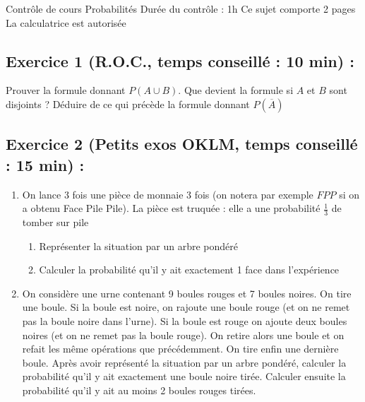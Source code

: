 

\usepackage[c]{esvect}
\newcommand{\covec}[2]{\begin{pmatrix}#1 \\#2 \end{pmatrix}}


\center
\Large Contrôle de cours
\flushleft
\center
Probabilités
\flushleft \normalsize
Durée du contrôle : 1h\newline
Ce sujet comporte 2 pages\newline
La calculatrice est autorisée
\subsection*{Exercice 1 (R.O.C., temps conseillé : 10 min) : }
Prouver la formule donnant $P(A\cup B)$. Que devient la formule si $A$ et $B$ sont disjoints ? Déduire de ce qui précède la formule donnant $P(\overline{A})$
\subsection*{Exercice 2 (Petits exos OKLM, temps conseillé : 15 min) : }
\begin{enumerate}
\item On lance 3 fois une pièce de monnaie 3 fois (on notera par exemple $FPP$ si on a obtenu Face Pile Pile). La pièce est truquée : elle a une probabilité $\displaystyle \frac{1}{3}$ de tomber sur pile
\begin{enumerate}
\item Représenter la situation par un arbre pondéré
\item Calculer la probabilité qu'il y ait exactement 1 face dans l'expérience
\end{enumerate}
\item On considère une urne contenant 9 boules rouges et 7 boules noires. On tire une boule. Si la boule est noire, on rajoute une boule rouge (et on ne remet pas la boule noire dans l'urne). Si la boule est rouge on ajoute deux boules noires (et on ne remet pas la boule rouge). On retire alors une boule et on refait les même opérations que précédemment. On tire enfin une dernière boule. Après avoir représenté la situation par un arbre pondéré, calculer la probabilité qu'il y ait exactement une boule noire tirée. Calculer ensuite la probabilité qu'il y ait au moins 2 boules rouges tirées.
\end{enumerate}
